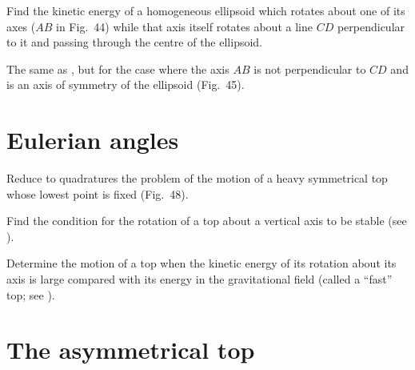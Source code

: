 \begin{problem}[title={Ellipsoid, perpendicular axes: kinetic energy}]
{
Find the kinetic energy of a homogeneous ellipsoid which rotates about one of its axes ($AB$ in Fig.~44) while that axis itself rotates about a line $CD$ perpendicular to it and passing through the centre of the ellipsoid.
}
{}
{}
\end{problem}


\begin{problem}[title={Ellipsoid, two inclined axes: kinetic energy}]
{
The same as , but for the case where the axis $AB$ is not perpendicular to $CD$ and is an axis of symmetry of the ellipsoid (Fig.~45).
}
{}
{}
\end{problem}

\section{Eulerian angles}


\begin{problem}[title={Heavy symmetrical top reduced to quadratures}]
{
Reduce to quadratures the problem of the motion of a heavy symmetrical top whose lowest point is fixed (Fig.~48).
}
{}
{}
\end{problem}


\begin{problem}[title={Stability of a top spinning upright}]
{
Find the condition for the rotation of a top about a vertical axis to be stable (see ).
}
{}
{}
\end{problem}


\begin{problem}[title={Motion of a fast top}]
{
Determine the motion of a top when the kinetic energy of its rotation about its axis is large compared with its energy in the gravitational field (called a ``fast'' top; see ).
}
{}
{}
\end{problem}

\section{The asymmetrical top}

